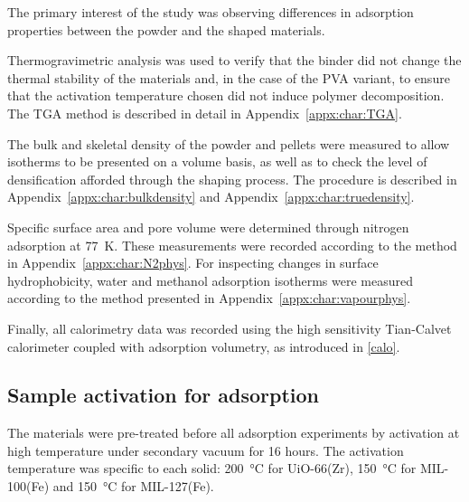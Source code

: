 The primary interest of the study was observing differences
in adsorption properties between the powder and the shaped materials.

Thermogravimetric analysis was used to verify that the binder
did not change the thermal stability of the materials and, in the
case of the PVA variant, to ensure that the activation temperature
chosen did not induce polymer decomposition. The TGA method is described
in detail in Appendix~\ref{appx:char:TGA}.

The bulk and skeletal density of the powder and pellets were measured
to allow isotherms to be presented on a volume basis, as well as
to check the level of densification afforded through the
shaping process. The procedure is described in Appendix~\ref{appx:char:bulkdensity} and Appendix~\ref{appx:char:truedensity}.

Specific surface area and pore volume were determined through
nitrogen adsorption at \SI{77}{\kelvin}. These measurements were
recorded according to the method in Appendix~\ref{appx:char:N2phys}.
For inspecting changes in surface hydrophobicity, water and
methanol adsorption isotherms were measured according to
the method presented in Appendix~\ref{appx:char:vapourphys}.

Finally, all calorimetry data was recorded using the high sensitivity
Tian-Calvet calorimeter coupled with adsorption volumetry, as
introduced in \autoref{calo}.

\subsection{Sample activation for adsorption}

The materials were pre-treated before all adsorption experiments by
activation at high temperature under secondary vacuum for 16 hours.
The activation temperature was specific
to each solid: \SI{200}{\degreeCelsius} for UiO-66(Zr),
\SI{150}{\degreeCelsius} for MIL-100(Fe) and \SI{150}{\degreeCelsius}
for MIL-127(Fe).
